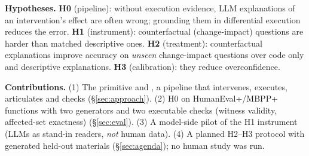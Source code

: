 \textbf{Hypotheses.}
\textbf{H0} (pipeline): without execution evidence, LLM explanations of an intervention's effect are often wrong;
grounding them in differential execution reduces the error.
\textbf{H1} (instrument): counterfactual (change-impact) questions are harder than matched descriptive ones.
\textbf{H2} (treatment): counterfactual explanations improve accuracy on \emph{unseen} change-impact questions over
code only and descriptive explanations. \textbf{H3} (calibration): they reduce overconfidence.

\textbf{Contributions.} (1) The primitive and \CoDE, a pipeline that intervenes, executes, articulates and checks
(\S\ref{sec:approach}). (2) H0 on \SNMutants{} HumanEval+/MBPP+ functions with two generators and two executable checks
(witness validity, affected-set exactness) (\S\ref{sec:eval}). (3) A model-side pilot of the H1 instrument
(LLMs as stand-in readers, \emph{not} human data). (4) A planned H2--H3 protocol
with generated held-out materials (\S\ref{sec:agenda}); no human study was run.
